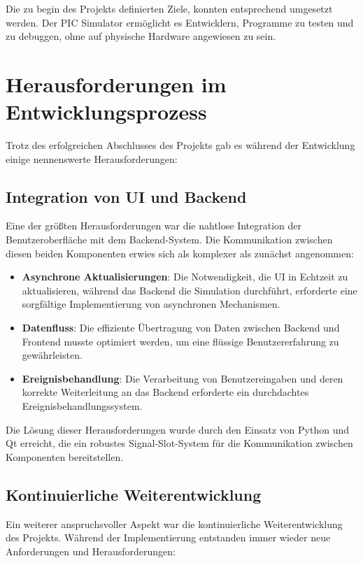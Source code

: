 \documentclass[a4paper,11pt]{report}
\begin{document}
Die zu begin des Projekts definierten Ziele, konnten entsprechend umgesetzt werden. Der PIC Simulator ermöglicht es Entwicklern, Programme zu testen und zu debuggen, ohne auf physische Hardware angewiesen zu sein.

\section{Herausforderungen im Entwicklungsprozess}

Trotz des erfolgreichen Abschlusses des Projekts gab es während der Entwicklung einige nennenswerte Herausforderungen:

\subsection{Integration von UI und Backend}

Eine der größten Herausforderungen war die nahtlose Integration der Benutzeroberfläche mit dem Backend-System. Die Kommunikation zwischen diesen beiden Komponenten erwies sich als komplexer als zunächst angenommen:

\begin{itemize}
    \item \textbf{Asynchrone Aktualisierungen}: Die Notwendigkeit, die UI in Echtzeit zu aktualisieren, während das Backend die Simulation durchführt, erforderte eine sorgfältige Implementierung von asynchronen Mechanismen.
    \item \textbf{Datenfluss}: Die effiziente Übertragung von Daten zwischen Backend und Frontend musste optimiert werden, um eine flüssige Benutzererfahrung zu gewährleisten.
    \item \textbf{Ereignisbehandlung}: Die Verarbeitung von Benutzereingaben und deren korrekte Weiterleitung an das Backend erforderte ein durchdachtes Ereignisbehandlungssystem.
\end{itemize}

Die Lösung dieser Herausforderungen wurde durch den Einsatz von Python und Qt erreicht, die ein robustes Signal-Slot-System für die Kommunikation zwischen Komponenten bereitstellen.

\subsection{Kontinuierliche Weiterentwicklung}

Ein weiterer anspruchsvoller Aspekt war die kontinuierliche Weiterentwicklung des Projekts. Während der Implementierung entstanden immer wieder neue Anforderungen und Herausforderungen:
\end{document}
